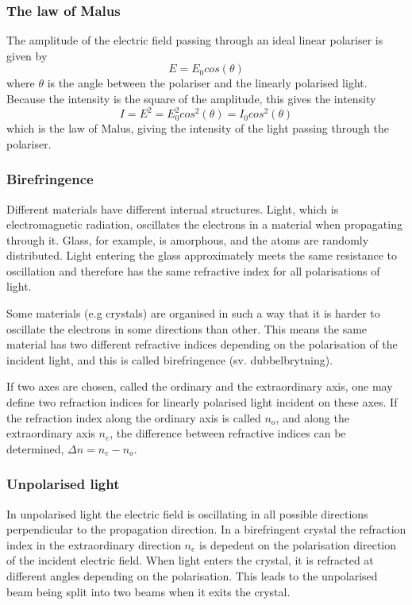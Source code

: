 \documentclass[a4paper]{article}
\begin{document}
\subsubsection{The law of Malus}
The amplitude of the electric field passing through an ideal linear polariser is given by
\begin{equation*}
    E = E_0 cos(\theta)
\end{equation*}
where $\theta$ is the angle between the polariser and the linearly polarised light. Because the intensity is the square of the amplitude, this gives the intensity
\begin{equation*}
    I = E^2 = E_0^2 cos^2(\theta) = I_0 cos^2(\theta)
\end{equation*}
which is the law of Malus, giving the intensity of the light passing through the polariser.

\subsubsection{Birefringence}
Different materials have different internal structures. Light, which is electromagnetic radiation, oscillates the electrons in a material when propagating through it.
Glass, for example, is amorphous, and the atoms are randomly distributed. Light entering the glass approximately meets the same resistance to oscillation and therefore
has the same refractive index for all polarisations of light. 

Some materials (e.g crystals) are organised in such a way that it is harder to oscillate the electrons in
some directions than other. This means the same material has two different refractive indices depending on the polarisation of the incident light, and this is called birefringence
(sv. dubbelbrytning). 

If two axes are chosen, called the ordinary and the extraordinary axis, one may define two refraction indices for linearly polarised light incident on these
axes. If the refraction index along the ordinary axis is called $n_o$, and along the extraordinary axis $n_e$, the difference between refractive indices can be determined,
$\Delta n = n_e - n_o$.

\subsubsection{Unpolarised light}
In unpolarised light the electric field is oscillating in all possible directions perpendicular to the propagation direction. In a birefringent crystal the refraction index in the 
extraordinary direction $n_e$ is depedent on the polarisation direction of the incident electric field. When light enters the crystal, it is refracted at different angles depending
on the polarisation. This leads to the unpolarised beam being split into two beams when it exits the crystal\cite{wiki}.
\end{document}
